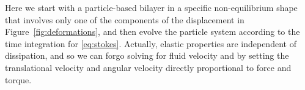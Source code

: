 %

Here we start with a particle-based bilayer in a specific non-equilibrium shape that involves only one of the components of the displacement in Figure~\ref{fig:deformations}, and then evolve the particle system according to the time integration for \eqref{eq:stokes}.
Actually,  elastic properties are independent of dissipation, and so we can forgo solving for fluid velocity and by setting the translational
velocity and angular velocity directly proportional to force and torque. 

